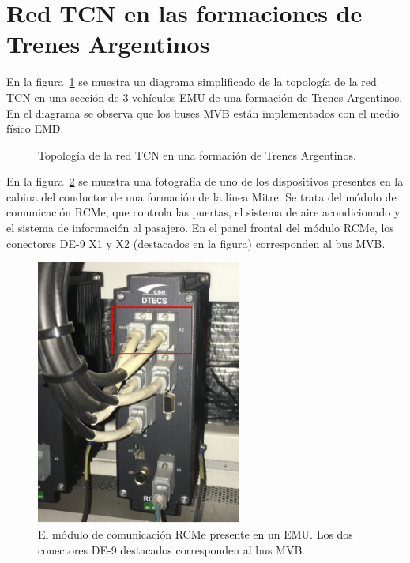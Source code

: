 \section{Red TCN en las formaciones de Trenes Argentinos}

En la figura~\ref{fig:tms} se muestra un diagrama simplificado de la topología de la red TCN en una sección de 3 vehículos EMU de una formación de Trenes Argentinos. En el diagrama se observa que los buses MVB están implementados con el medio físico EMD.

\begin{figure}[htbp]
	\centering
    {
        \fontsize{8pt}{8pt}\selectfont
        
    }
	\caption[Topología de la red TCN en una formación de Trenes Argentinos]{Topología de la red TCN en una formación de Trenes Argentinos.}
    \label{fig:tms}
\end{figure}

En la figura~\ref{fig:rcme} se muestra una fotografía de uno de los dispositivos presentes en la cabina del conductor de una formación de la línea Mitre. Se trata del módulo de comunicación RCMe, que controla las puertas, el sistema de aire acondicionado y el sistema de información al pasajero. En el panel frontal del módulo RCMe, los conectores DE-9 X1 y X2 (destacados en la figura) corresponden al bus MVB.

\begin{figure}[htbp]
	\centering
	\includegraphics[width=0.6\textwidth]{./Figures/RCMe.pdf}
	\caption[El módulo de comunicación RCMe]{El módulo de comunicación RCMe presente en un EMU. Los dos conectores DE-9 destacados corresponden al bus MVB.}
    \label{fig:rcme}
\end{figure}

